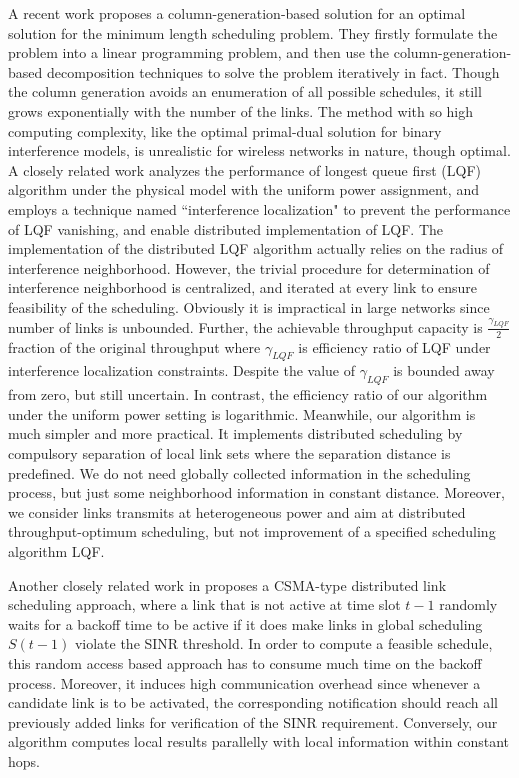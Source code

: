 \documentclass[journal]{IEEEtran}
\begin{document}
\indent A recent work \cite{S:phy16} proposes a column-generation-based solution for an optimal solution for the minimum length scheduling problem. They firstly formulate the problem into a linear programming problem, and then use the column-generation-based decomposition techniques to solve the problem iteratively in fact. Though the column generation avoids an enumeration of all possible schedules, it still grows exponentially with the number of the links. The method with so high computing complexity, like the optimal primal-dual solution for binary interference models, is unrealistic for wireless networks in nature, though optimal.\\
\indent A closely related work \cite{S:phy7} analyzes the performance of longest queue first (LQF) algorithm under the physical model with the uniform power assignment, and employs a technique named ``interference localization" to prevent the performance of LQF vanishing, and enable distributed implementation of LQF. The implementation of the distributed LQF algorithm actually relies on the radius of interference neighborhood.  However, the trivial procedure for determination of interference neighborhood is centralized, and iterated at every link to ensure feasibility of the scheduling. Obviously it is impractical in large networks since number of links is unbounded. Further, the achievable throughput capacity is $\frac{\gamma_{LQF}}{2}$ fraction of the original throughput where $\gamma_{LQF}$ is efficiency ratio of LQF under interference localization constraints. Despite the value of  $\gamma_{LQF}$ is bounded away from zero, but still uncertain. In contrast, the efficiency ratio of our algorithm under the uniform power setting is logarithmic. Meanwhile, our algorithm is much simpler and more practical. It implements distributed scheduling by compulsory separation of local link sets where the separation distance is predefined.  We do not need globally collected information  in the scheduling process, but just some neighborhood information in constant distance.
 Moreover, we consider links transmits at heterogeneous power and aim at distributed throughput-optimum scheduling, but not improvement of a specified scheduling algorithm LQF.

 Another closely related work in \cite{S:dphy1} proposes a CSMA-type distributed link scheduling approach, where a link that is not active at time slot $t-1$ randomly waits for a backoff time to be active if it does make links in global scheduling $S(t-1)$ violate the SINR threshold. In order to compute a feasible schedule, this random access based approach has to consume much time on the backoff process. Moreover, it induces high communication overhead since whenever a candidate link is to be activated, the corresponding notification should reach all previously added links for verification of the SINR requirement. Conversely, our algorithm computes local results parallelly with local information within constant hops.
\end{document}
